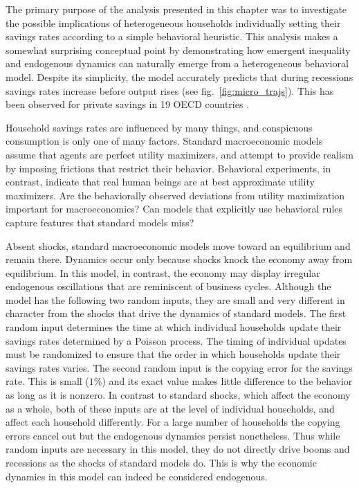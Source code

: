 The primary purpose of the analysis presented in this chapter was to investigate the possible implications of heterogeneous households individually setting their savings rates according to a simple behavioral heuristic. This analysis makes a somewhat surprising conceptual point by demonstrating how emergent inequality and endogenous dynamics can naturally emerge from a heterogeneous behavioral model. Despite its simplicity, the model accurately predicts that during recessions savings rates increase before output rises (see fig.~\ref{fig:micro_trajs}).
This has been observed for private savings in 19 OECD countries \citep{adema2015business}. 

Household savings rates are influenced by many things, and conspicuous consumption is only one of many factors. Standard macroeconomic models assume that agents are perfect utility maximizers, and attempt to provide realism by imposing frictions that restrict their behavior. Behavioral experiments, in contrast, indicate that real human beings are at best approximate utility maximizers.  Are the behaviorally observed deviations from utility maximization important for macroeconomics?  Can models that explicitly use behavioral rules capture features that standard models miss?

Absent shocks, standard macroeconomic models move toward an equilibrium and remain there.   Dynamics occur only because shocks knock the economy away from equilibrium. In this model, in contrast, the economy may display irregular endogenous oscillations that are reminiscent of business cycles.  
Although the model has the following two random inputs, they are small and very different in character from the shocks that drive the dynamics of standard models. The first random input determines the time at which individual households update their savings rates determined by a Poisson process. The timing of individual updates must be randomized to ensure that the order in which households update their savings rates varies. The second random input is the copying error for the savings rate.  This is small ($1\%$) and its exact value makes little difference to the behavior as long as it is nonzero. In contrast to standard shocks, which affect the economy as a whole, both of these inputs are at the level of individual households, and affect each household differently. For a large number of households the copying errors cancel out but the endogenous dynamics persist nonetheless. Thus while random inputs are necessary in this model, they do not directly drive booms and recessions as the shocks of standard models do. This is why the economic dynamics in this model can indeed be considered endogenous.

